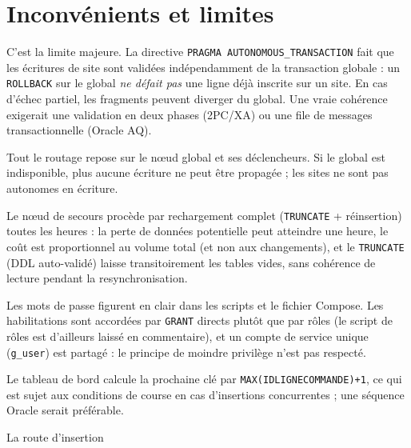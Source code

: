 \documentclass[11pt,a4paper]{article}
\begin{document}
\section{Inconvénients et limites}
\label{sec:limites}

\begin{description}[leftmargin=0.6cm,style=nextline]
  \item[\textbf{Absence d'atomicité distribuée}] C'est la limite majeure. La
    directive \texttt{PRAGMA AUTONOMOUS\_TRANSACTION} fait que les écritures de
    site sont validées indépendamment de la transaction globale : un
    \texttt{ROLLBACK} sur le global \emph{ne défait pas} une ligne déjà inscrite
    sur un site. En cas d'échec partiel, les fragments peuvent diverger du
    global. Une vraie cohérence exigerait une validation en deux phases (2PC/XA)
    ou une file de messages transactionnelle (Oracle AQ).
  \item[\textbf{Point de défaillance unique (SPOF)}] Tout le routage repose sur
    le nœud global et ses déclencheurs. Si le global est indisponible, plus
    aucune écriture ne peut être propagée ; les sites ne sont pas autonomes en
    écriture.
  \item[\textbf{Sauvegarde grossière (RPO élevé)}] Le nœud de secours procède
    par rechargement complet (\texttt{TRUNCATE} + réinsertion) toutes les
    heures : la perte de données potentielle peut atteindre une heure, le coût
    est proportionnel au volume total (et non aux changements), et le
    \texttt{TRUNCATE} (DDL auto-validé) laisse transitoirement les tables vides,
    sans cohérence de lecture pendant la resynchronisation.
  \item[\textbf{Sécurité perfectible}] Les mots de passe figurent en clair dans
    les scripts et le fichier Compose. Les habilitations sont accordées par
    \texttt{GRANT} directs plutôt que par rôles (le script de rôles est
    d'ailleurs laissé en commentaire), et un compte de service unique
    (\texttt{g\_user}) est partagé : le principe de moindre privilège n'est pas
    respecté.
  \item[\textbf{Génération de clés primaires fragile}] Le tableau de bord
    calcule la prochaine clé par \texttt{MAX(IDLIGNECOMMANDE)+1}, ce qui est
    sujet aux conditions de course en cas d'insertions concurrentes ; une
    séquence Oracle serait préférable.
  \item[\textbf{Propagation observée par temporisation}] La route d'insertion

\end{description}
\end{document}
